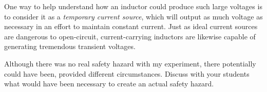 
One way to help understand how an inductor could produce such large voltages is to consider it as a {\it temporary current source}, which will output as much voltage as necessary in an effort to maintain constant current.  Just as ideal current sources are dangerous to open-circuit, current-carrying inductors are likewise capable of generating tremendous transient voltages.

Although there was no real safety hazard with my experiment, there potentially could have been, provided different circumstances.  Discuss with your students what would have been necessary to create an actual safety hazard.




